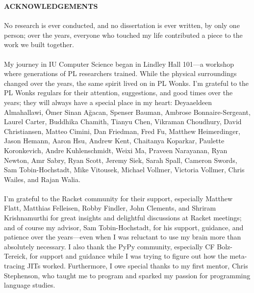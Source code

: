 \begin{centering}
\textbf{ACKNOWLEDGEMENTS}\\
\vspace{\baselineskip}
\end{centering}

\paragraph{}%
No research is ever conducted, and no dissertation is ever written, by only one person; over the years, everyone who touched my life contributed a piece to the work we built together.

\paragraph{}%
My journey in IU Computer Science began in Lindley Hall 101—a workshop where generations of PL researchers trained. While the physical surroundings changed over the years, the same spirit lived on in PL Wonks. I'm grateful to the PL Wonks regulars for their attention, suggestions, and good times over the years; they will always have a special place in my heart: Deyaaeldeen Almahallawi, Ömer Sinan Ağacan, Spenser Bauman, Ambrose Bonnaire-Sergeant, Laurel Carter, Buddhika Chamith, Tianyu Chen, Vikraman Choudhury, David Christiansen, Matteo Cimini, Dan Friedman, Fred Fu, Matthew Heimerdinger, Jason Hemann, Aaron Hsu, Andrew Kent, Chaitanya Koparkar, Paulette Koronkevich, Andre Kuhlenschmidt, Weixi Ma, Praveen Narayanan, Ryan Newton, Amr Sabry, Ryan Scott, Jeremy Siek, Sarah Spall, Cameron Swords, Sam Tobin-Hochstadt, Mike Vitousek, Michael Vollmer, Victoria Vollmer, Chris Wailes, and Rajan Walia.

\paragraph{}%
I'm grateful to the Racket community for their support, especially Matthew Flatt, Matthias Felleisen, Robby Findler, John Clements, and Shriram Krishnamurthi for great insights and delightful discussions at Racket meetings; and of course my advisor, Sam Tobin-Hochstadt, for his support, guidance, and patience over the years—even when I was reluctant to use my brain more than absolutely necessary. I also thank the PyPy community, especially CF Bolz-Tereick, for support and guidance while I was trying to figure out how the meta-tracing JITs worked. Furthermore, I owe special thanks to my first mentor, Chris Stephenson, who taught me to program and sparked my passion for programming language studies.

